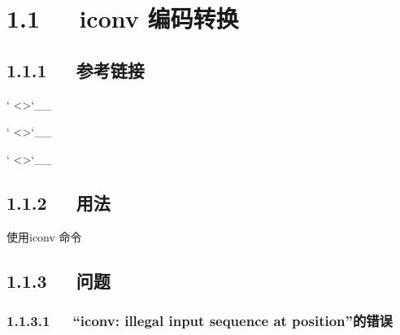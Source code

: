 \documentclass[letterpaper,12pt,english]{sphinxmanual}
\begin{document}
\section{1.1   iconv 编码转换}
\label{\detokenize{001software/001install/tools:iconv}}

\subsection{1.1.1   参考链接}
\label{\detokenize{001software/001install/tools:id1}}
` <>`\_\_


` <>`\_\_

` <>`\_\_


\subsection{1.1.2   用法}
\label{\detokenize{001software/001install/tools:id2}}
使用iconv 命令

\begin{sphinxVerbatim}[commandchars=\\\{\}]
       

\end{sphinxVerbatim}


\subsection{1.1.3   问题}
\label{\detokenize{001software/001install/tools:id3}}

\subsubsection{1.1.3.1   “iconv: illegal input sequence at position”的错误}
\label{\detokenize{001software/001install/tools:iconv-illegal-input-sequence-at-position}}
\end{document}
